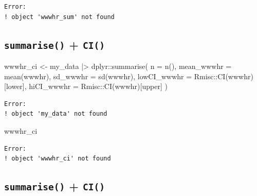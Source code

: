\documentclass[
  letterpaper,
  DIV=11,
  numbers=noendperiod]{scrartcl}
\newenvironment{Shaded}{\begin{snugshade}}{\end{snugshade}}
\newcommand{\AttributeTok}[1]{\textcolor[rgb]{0.40,0.45,0.13}{#1}}
\newcommand{\FunctionTok}[1]{\textcolor[rgb]{0.28,0.35,0.67}{#1}}
\newcommand{\NormalTok}[1]{\textcolor[rgb]{0.00,0.23,0.31}{#1}}
\newcommand{\OtherTok}[1]{\textcolor[rgb]{0.00,0.23,0.31}{#1}}
\newcommand{\SpecialCharTok}[1]{\textcolor[rgb]{0.37,0.37,0.37}{#1}}
\newcommand{\StringTok}[1]{\textcolor[rgb]{0.13,0.47,0.30}{#1}}
\begin{document}
\begin{verbatim}
Error:
! object 'wwwhr_sum' not found
\end{verbatim}

\subsection{\texorpdfstring{\texttt{summarise()} +
\texttt{CI()}}{summarise() + CI()}}\label{summarise-ci}

\begin{Shaded}
\begin{Highlighting}[]
\NormalTok{wwwhr\_ci }\OtherTok{\textless{}{-}}\NormalTok{ my\_data }\SpecialCharTok{|\textgreater{}}
\NormalTok{  dplyr}\SpecialCharTok{::}\FunctionTok{summarise}\NormalTok{(}
    \AttributeTok{n =} \FunctionTok{n}\NormalTok{(),}
    \AttributeTok{mean\_wwwhr =} \FunctionTok{mean}\NormalTok{(wwwhr),}
    \AttributeTok{sd\_wwwhr =} \FunctionTok{sd}\NormalTok{(wwwhr),}
    \AttributeTok{lowCI\_wwwhr =}\NormalTok{ Rmisc}\SpecialCharTok{::}\FunctionTok{CI}\NormalTok{(wwwhr)[}\StringTok{\textquotesingle{}lower\textquotesingle{}}\NormalTok{],}
    \AttributeTok{hiCI\_wwwhr  =}\NormalTok{ Rmisc}\SpecialCharTok{::}\FunctionTok{CI}\NormalTok{(wwwhr)[}\StringTok{\textquotesingle{}upper\textquotesingle{}}\NormalTok{]}
\NormalTok{    )}
\end{Highlighting}
\end{Shaded}

\begin{verbatim}
Error:
! object 'my_data' not found
\end{verbatim}

\begin{Shaded}
\begin{Highlighting}[]
\NormalTok{wwwhr\_ci}
\end{Highlighting}
\end{Shaded}

\begin{verbatim}
Error:
! object 'wwwhr_ci' not found
\end{verbatim}

\subsection{\texorpdfstring{\texttt{summarise()} +
\texttt{CI()}}{summarise() + CI()}}\label{summarise-ci-1}
\end{document}
